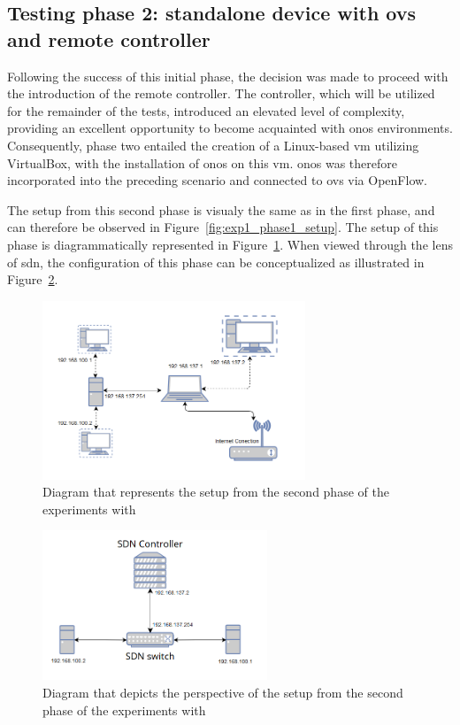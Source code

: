\subsection[Testing phase 2: standalone device with OvS and remote controller]{Testing phase 2: standalone device with \gls{ovs} and remote controller}
Following the success of this initial phase, the decision was made to proceed with the introduction of the remote controller. The controller, which will be utilized for the remainder of the tests, introduced an elevated level of complexity, providing an excellent opportunity to become acquainted with \gls{onos} environments. Consequently, phase two entailed the creation of a Linux-based \gls{vm} utilizing VirtualBox, with the installation of \gls{onos} on this \gls{vm}. \gls{onos} was therefore incorporated into the preceding scenario and connected to \gls{ovs} via OpenFlow.

The setup from this second phase is visualy the same as in the first phase, and can therefore be observed in Figure~\ref{fig:exp1_phase1_setup}. The setup of this phase is diagrammatically represented in Figure~\ref{fig:exp1_phase2_diagram}. When viewed through the lens of \gls{sdn}, the configuration of this phase can be conceptualized as illustrated in Figure~\ref{fig:exp1_phase2_sdn_diagram}.

\begin{figure}
	\centering
	\includegraphics[width=0.7\textwidth]{Chapters/Figures/tests/ovs_phase_2/setup_diagram.PNG}
	\caption{Diagram that represents the setup from the second phase of the experiments with }
	\label{fig:exp1_phase2_diagram}
\end{figure}

\begin{figure}
	\centering
	\includegraphics[width=0.6\textwidth]{Chapters/Figures/tests/ovs_phase_2/sdn_diagram.PNG}
	\caption{Diagram that depicts the  perspective of the setup from the second phase of the experiments with }
	\label{fig:exp1_phase2_sdn_diagram}
\end{figure}

